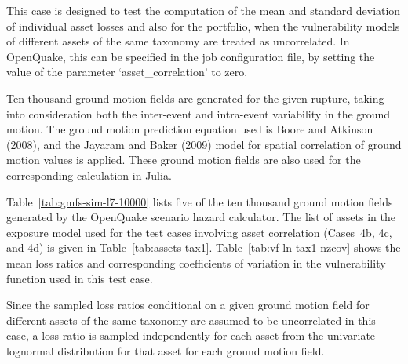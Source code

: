 This case is designed to test the computation of the mean and standard deviation of individual asset losses and also for the portfolio, when the vulnerability models of different assets of the same taxonomy are treated as uncorrelated. In OpenQuake, this can be specified in the job configuration file, by setting the value of the parameter `asset\_correlation' to zero.

Ten thousand ground motion fields are generated for the given rupture, taking into consideration both the inter-event and intra-event variability in the ground motion. The ground motion prediction equation used is Boore and Atkinson (2008), and the Jayaram and Baker (2009) model for spatial correlation of ground motion values is applied. These ground motion fields are also used for the corresponding calculation in Julia.




Table~\ref{tab:gmfs-sim-l7-10000} lists five of the ten thousand ground motion fields generated by the OpenQuake scenario hazard calculator. The list of assets in the exposure model used for the test cases involving asset correlation (Cases~4b, 4c, and 4d) is given in Table~\ref{tab:assets-tax1}. Table~\ref{tab:vf-ln-tax1-nzcov} shows the mean loss ratios and corresponding coefficients of variation in the vulnerability function used in this test case.

Since the sampled loss ratios conditional on a given ground motion field for different assets of the same taxonomy are assumed to be uncorrelated in this case, a loss ratio is sampled independently for each asset from the univariate lognormal distribution for that asset for each ground motion field.